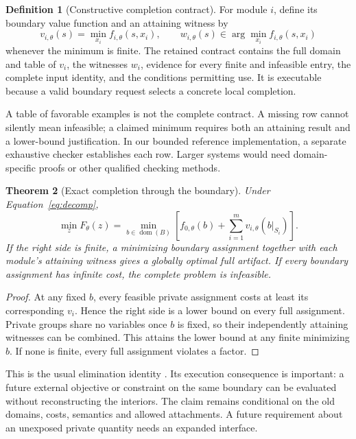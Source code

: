 \documentclass[11pt,letterpaper]{article}
\newtheorem{theorem}{Theorem}[section]
\theoremstyle{definition}\newtheorem{definition}[theorem]{Definition}
\theoremstyle{remark}\newtheorem{remark}[theorem]{Remark}
\newcommand{\dom}{\operatorname{dom}}\newcommand{\supp}{\operatorname{supp}}
\begin{document}
\begin{definition}[Constructive completion contract]
For module $i$, define its boundary value function and an attaining witness by
\begin{equation}
 v_{i,\theta}(s)=\min_{x_i}f_{i,\theta}(s,x_i),
 \qquad w_{i,\theta}(s)\in\arg\min_{x_i}f_{i,\theta}(s,x_i)
 \label{eq:profile}
\end{equation}
whenever the minimum is finite. The retained contract contains the full domain and table of $v_i$, the witnesses $w_i$, evidence for every finite and infeasible entry, the complete input identity, and the conditions permitting use. It is executable because a valid boundary request selects a concrete local completion.
\end{definition}

A table of favorable examples is not the complete contract. A missing row cannot silently mean infeasible; a claimed minimum requires both an attaining result and a lower-bound justification. In our bounded reference implementation, a separate exhaustive checker establishes each row. Larger systems would need domain-specific proofs or other qualified checking methods.

\begin{theorem}[Exact completion through the boundary]
\label{thm:composition}
Under Equation~\eqref{eq:decomp},
\begin{equation}
 \boxed{\quad \min_z F_\theta(z)
 =\min_{b\in\dom(B)}\left[f_{0,\theta}(b)+\sum_{i=1}^{m}v_{i,\theta}(b|_{S_i})\right].\quad}
 \label{eq:compose}
\end{equation}
If the right side is finite, a minimizing boundary assignment together with each module's attaining witness gives a globally optimal full artifact. If every boundary assignment has infinite cost, the complete problem is infeasible.
\end{theorem}
\begin{proof}
At any fixed $b$, every feasible private assignment costs at least its corresponding $v_i$. Hence the right side is a lower bound on every full assignment. Private groups share no variables once $b$ is fixed, so their independently attaining witnesses can be combined. This attains the lower bound at any finite minimizing $b$. If none is finite, every full assignment violates a factor.
\end{proof}

This is the usual elimination identity \citep{dechter}. Its execution consequence is important: a future external objective or constraint on the same boundary can be evaluated without reconstructing the interiors. The claim remains conditional on the old domains, costs, semantics and allowed attachments. A future requirement about an unexposed private quantity needs an expanded interface.
\end{document}
